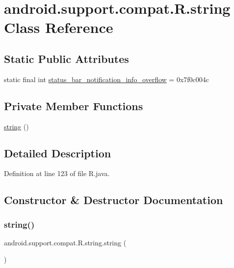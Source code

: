 \hypertarget{classandroid_1_1support_1_1compat_1_1_r_1_1string}{}\section{android.\+support.\+compat.\+R.\+string Class Reference}
\label{classandroid_1_1support_1_1compat_1_1_r_1_1string}
\subsection*{Static Public Attributes}
\begin{DoxyCompactItemize}
\item 
static final int \mbox{\hyperlink{classandroid_1_1support_1_1compat_1_1_r_1_1string_a7529efba925b9ba0a8d7ae1cab99f9db}{status\+\_\+bar\+\_\+notification\+\_\+info\+\_\+overflow}} = 0x7f0c004c
\end{DoxyCompactItemize}
\subsection*{Private Member Functions}
\begin{DoxyCompactItemize}
\item 
\mbox{\hyperlink{classandroid_1_1support_1_1compat_1_1_r_1_1string_ad5967601bca66f9012754d60c7c9e4d5}{string}} ()
\end{DoxyCompactItemize}


\subsection{Detailed Description}


Definition at line 123 of file R.\+java.



\subsection{Constructor \& Destructor Documentation}
\mbox{\label{classandroid_1_1support_1_1compat_1_1_r_1_1string_ad5967601bca66f9012754d60c7c9e4d5}} 
\subsubsection{\texorpdfstring{string()}{string()}}
{\footnotesize\ttfamily android.\+support.\+compat.\+R.\+string.\+string (\begin{DoxyParamCaption}{ }\end{DoxyParamCaption})\hspace{0.3cm}{\ttfamily [private]}}



